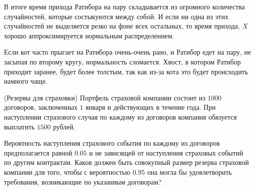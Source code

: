 \documentclass[12pt, a4paper, oneside]{article}
\begin{document}
В итоге время прихода Ратибора на пару складывается из огромного количества случайностей, которые состыкуются между собой. И если ни одна из этих случайностей не выделяется резко на фоне всех остальных, то время прихода, $X$ хорошо аппроксимируется нормальным распределением. 

Если кот часто прыгает на Ратибора очень-очень рано, и Ратибор едет на пару, не засыпая по второму кругу, нормальность сломается. Хвост, в котором Ратибор приходит заранее, будет более толстым, так как из-за кота это будет происходить намного чаще.


\begin{problem}{(Резервы для страховки)}
Портфель страховой компании состоит из $1000$ договоров, заключенных $1$
января и действующих в течение года. При наступлении страхового случая по каждому из договоров компания обязуется выплатить $1500$ рублей.

Вероятность наступления страхового события по каждому из договоров предполагается равной $0.05$ и не зависящей от наступления страховых событий по другим контрактам. Каков должен быть совокупный размер резерва страховой компании для того, чтобы с вероятностью $0.95$ она могла бы удовлетворить требования, возникающие по указанным договорам?
\end{problem}
\end{document}
